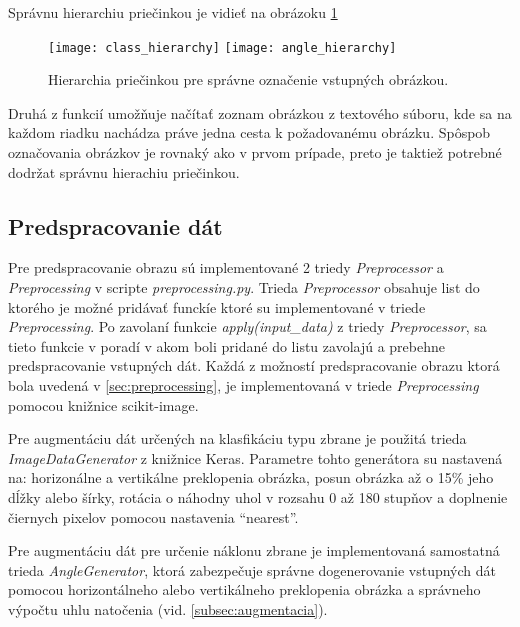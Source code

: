 Správnu hierarchiu priečinkou je vidieť na obrázoku \ref{pic:folderhierarchy}

\begin{figure}[H]
    \centering
    \texttt{[image: class\_hierarchy]}
    \qquad
    \texttt{[image: angle\_hierarchy]}
    \caption{Hierarchia priečinkou pre správne označenie vstupných obrázkou.}
    \label{pic:folderhierarchy}
\end{figure}

Druhá z funkcií umožňuje načítať zoznam obrázkou z textového súboru, kde sa na každom riadku nachádza práve jedna cesta k požadovanému obrázku.
Spôspob označovania obrázkov je rovnaký ako v prvom prípade, preto je taktiež potrebné dodržat správnu hierachiu priečinkou.

\subsection{Predspracovanie dát}
\label{subsec:predspracovaniedat}
Pre predspracovanie obrazu sú implementované 2 triedy \textit{Preprocessor} a \textit{Preprocessing} v scripte \textit{preprocessing.py}.
Trieda \textit{Preprocessor} obsahuje list do ktorého je možné pridávať funckíe ktoré su implementované v triede \textit{Preprocessing}.
Po zavolaní funkcie \textit{apply(input\_data)} z triedy \textit{Preprocessor}, sa tieto
    funkcie v poradí v akom boli pridané do listu zavolajú a prebehne predspracovanie vstupných dát.
Každá z možností predspracovanie obrazu ktorá bola uvedená v \ref{sec:preprocessing}, je implementovaná v triede \textit{Preprocessing} pomocou
    knižnice scikit-image.

Pre augmentáciu dát určených na klasfikáciu typu zbrane je použitá trieda \textit{ImageDataGenerator} z knižnice Keras.
Parametre tohto generátora su nastavená na: horizonálne a vertikálne preklopenia obrázka, posun obrázka až o 15\% jeho dĺžky alebo šírky,
    rotácia o náhodny uhol v rozsahu 0 až 180 stupňov a doplnenie čiernych pixelov pomocou nastavenia ``nearest''.

Pre augmentáciu dát pre určenie náklonu zbrane je implementovaná samostatná trieda \textit{AngleGenerator}, ktorá zabezpečuje správne dogenerovanie
    vstupných dát pomocou horizontálneho alebo vertikálneho preklopenia obrázka a správneho výpočtu uhlu natočenia (vid. \ref{subsec:augmentacia}).
